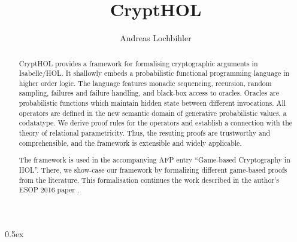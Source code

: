 \documentclass[11pt,a4paper]{article}
\begin{document}
\title{CryptHOL}
\author{Andreas Lochbihler}
\maketitle

\begin{abstract}
  CryptHOL provides a framework for formalising cryptographic arguments in Isabelle/HOL.
  It shallowly embeds a probabilistic functional programming language in higher order logic.
  The language features monadic sequencing, recursion, random sampling, failures and failure handling,
  and black-box access to oracles. Oracles are probabilistic functions which maintain hidden state
  between different invocations.  All operators are defined in the new semantic domain of generative
  probabilistic values, a codatatype.  We derive proof rules for the operators and establish a connection
  with the theory of relational parametricity.  Thus, the resuting proofs are trustworthy and comprehensible,
  and the framework is extensible and widely applicable.

  The framework is used in the accompanying AFP entry ``Game-based Cryptography in HOL''.
  There, we show-case our framework by formalizing different game-based proofs from the literature.
  This formalisation continues the work described in the author's ESOP 2016 paper \cite{Lochbihler2016ESOP}.
\end{abstract}


\tableofcontents

\clearpage

\parindent 0pt\parskip 0.5ex





\end{document}
